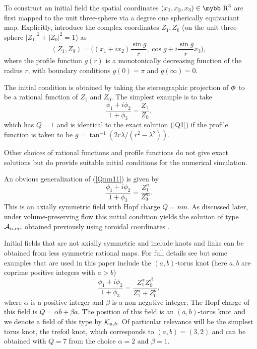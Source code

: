 \documentclass[12pt]{article}
\newcommand{\be}{\begin{equation}}
\newcommand{\ee}{\end{equation}}
\newcommand{\bphi}{\mbox{\boldmath $\phi$}}
\def\bb#1{\hbox{\mybb#1}}
\begin{document}
To construct an initial field the spatial coordinates 
$(x_1,x_2,x_3)\in \bb{R}^3$ are first mapped to the
unit three-sphere via a degree one spherically equivariant map.
Explicitly, introduce the complex coordinates $Z_1,Z_0$ (on the unit
three-sphere $|Z_1|^2+|Z_0|^2=1$) as
\be (Z_1,Z_0)=\bigg((x_1+ix_2)\frac{\sin g}{r},\cos
g+i\frac{\sin g}{r}x_3\bigg),\ee where 
the profile function $g(r)$ is a monotonically decreasing function of
the radius $r$, with boundary conditions $g(0)=\pi$ and
$g(\infty)=0.$ 

The initial condition is obtained by taking the stereographic
projection of $\bphi$ to be a rational function of $Z_1$ and $Z_0.$
The simplest example is to take 
\be
\frac{\phi_1+i\phi_2}{1+\phi_3}=\frac{Z_1}{Z_0},
\label{Qnm11}
\ee
which has $Q=1$ and is identical to the exact solution (\ref{Q1}) 
if the profile function is taken to be
 $g=\tan^{-1}(2r\lambda/(r^2-\lambda^2)).$

Other choices of rational functions and profile functions 
do not give exact solutions 
but do provide suitable initial conditions for the numerical simulation.

An obvious generalization of (\ref{Qnm11}) is given by 
\be
\frac{\phi_1+i\phi_2}{1+\phi_3}=\frac{Z_1^n}{Z_0^m}.
\label{Qnm}
\ee
This is an axially symmetric field with Hopf charge $Q=nm.$
As discussed later, under
volume-preserving flow this initial condition
yields the solution of type ${\cal A}_{n,m},$ obtained
previously using toroidal coordinates \cite{ASVW}.

Initial fields that are not axially symmetric and include knots and
links can be obtained from less symmetric rational maps.
For full details see \cite{Su} but some examples that are used in
this paper include the $(a,b)$-torus knot (here $a,b$ are 
coprime positive integers with $a>b$)
\be
\frac{\phi_1+i\phi_2}{1+\phi_3}=\frac{Z_1^\alpha Z_0^\beta}{Z_1^a+Z_0^b},
\label{Qab}
\ee
where $\alpha$ is a positive integer and $\beta$ is a non-negative 
integer. The Hopf charge of this field is $Q=\alpha b+\beta a.$
The position of this field is an $(a,b)$-torus knot and we denote
a field of this type by ${\cal K}_{a,b}.$ Of particular relevance
will be the simplest torus knot, the trefoil knot, which corresponds
to $(a,b)=(3,2)$ and can be obtained with $Q=7$ from the choice $\alpha=2$
and $\beta=1.$
\end{document}
